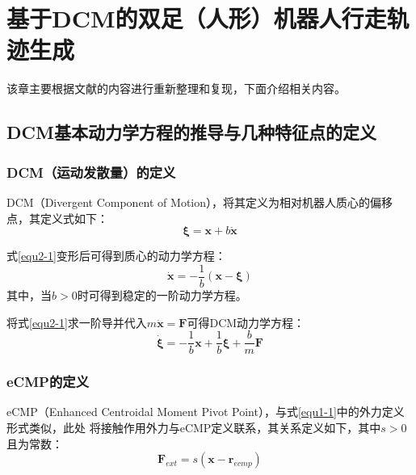 \section{基于DCM的双足（人形）机器人行走轨迹生成}
    该章主要根据文献\cite{englsbergerThreedimensionalBipedalWalking2013}的内容进行重新整理和复现，下面介绍相关内容。
    \subsection{DCM基本动力学方程的推导与几种特征点的定义}
        \subsubsection{DCM（运动发散量）的定义}
            DCM（Divergent Component of Motion），将其定义为相对机器人质心的偏移点，其定义式如下：
            \begin{equation}
                \boldsymbol{\xi }=\boldsymbol{x}+b\boldsymbol{\dot{x}}
                \label{equ2-1}
            \end{equation}

            式\eqref{equ2-1}变形后可得到质心的动力学方程：
            \begin{equation}
                \boldsymbol{\dot{x}}=-\frac{1}{b}\left( \boldsymbol{x}-\boldsymbol{\xi } \right) 
                \label{equ2-2}
            \end{equation}
            其中，当$b>0$时可得到稳定的一阶动力学方程。

            将式\eqref{equ2-1}求一阶导并代入$m\boldsymbol{\ddot{x}}=\boldsymbol{F}$可得DCM动力学方程：
            \begin{equation}
                \boldsymbol{\dot{\xi}}=-\frac{1}{b}\boldsymbol{x}+\frac{1}{b}\boldsymbol{\xi }+\frac{b}{m}\boldsymbol{F} 
                \label{equ2-3}
            \end{equation}
        \subsubsection{eCMP的定义}
            eCMP（Enhanced Centroidal Moment Pivot Point），与式\eqref{equ1-1}中的外力定义形式类似，此处
            将接触作用外力与eCMP定义联系，其关系定义如下，其中$s>0$且为常数：
            \begin{equation}
                \boldsymbol{F}_{ext}=s\left( \boldsymbol{x}-\boldsymbol{r}_{ecmp} \right) 
                \label{equ2-4}
            \end{equation}

